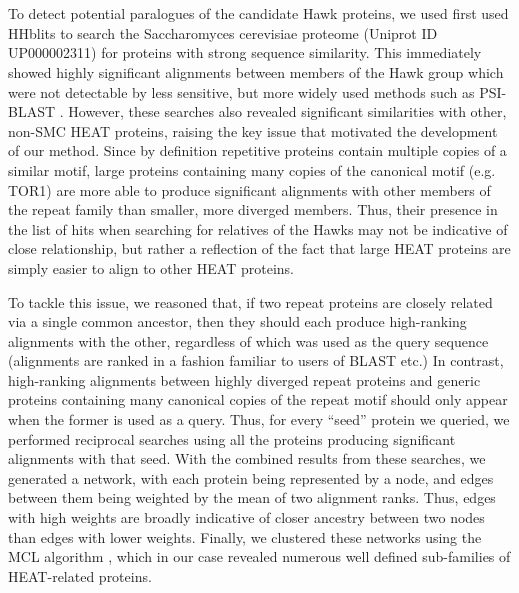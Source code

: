 \documentclass[a4paper,11pt,twoside,openright]{scrbook}
\let\cite\supercite
\begin{document}
\section{}
To detect potential paralogues of the candidate Hawk proteins, we used first used HHblits to search the Saccharomyces cerevisiae proteome (Uniprot ID UP000002311) for proteins with strong sequence similarity. This immediately showed highly significant alignments between members of the Hawk group which were not detectable by less sensitive, but more widely used methods such as PSI-BLAST \cite{Altschul1997}. However, these searches also revealed significant similarities with other, non-SMC HEAT proteins, raising the key issue that motivated the development of our method. Since by definition repetitive proteins contain multiple copies of a similar motif, large proteins containing many copies of the canonical motif (e.g. TOR1) are more able to produce significant alignments with other members of the repeat family than smaller, more diverged members. Thus, their presence in the list of hits when searching for relatives of the Hawks may not be indicative of close relationship, but rather a reflection of the fact that large HEAT proteins are simply easier to align to other HEAT proteins.

To tackle this issue, we reasoned that, if two repeat proteins are closely related via a single common ancestor, then they should each produce high-ranking alignments with the other, regardless of which was used as the query sequence (alignments are ranked in a fashion familiar to users of BLAST etc.) In contrast, high-ranking alignments between highly diverged repeat proteins and generic proteins containing many canonical copies of the repeat motif should only appear when the former is used as a query. Thus, for every “seed” protein we queried, we performed reciprocal searches using all the proteins producing significant alignments with that seed. With the combined results from these searches, we generated a network, with each protein being represented by a node, and edges between them being weighted by the mean of two alignment ranks. Thus, edges with high weights are broadly indicative of closer ancestry between two nodes than edges with lower weights. Finally, we clustered these networks using the MCL algorithm \cite{VanDongen2000}, which in our case revealed numerous well defined sub-families of HEAT-related proteins.
\end{document}
